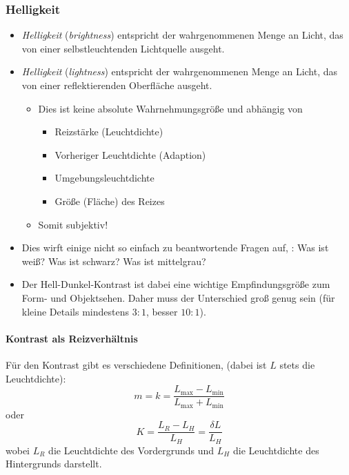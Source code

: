 			\subsubsection{Helligkeit}
				\begin{itemize}
					\item \emph{Helligkeit} (\emph{brightness}) entspricht der wahrgenommenen Menge an Licht, das von einer selbstleuchtenden Lichtquelle ausgeht.
					\item \emph{Helligkeit} (\emph{lightness}) entspricht der wahrgenommenen Menge an Licht, das von einer reflektierenden Oberfläche ausgeht.
						\begin{itemize}
							\item Dies ist keine absolute Wahrnehmungsgröße und abhängig von
								\begin{itemize}
									\item Reizstärke (Leuchtdichte)
									\item Vorheriger Leuchtdichte (Adaption)
									\item Umgebungsleuchtdichte
									\item Größe (Fläche) des Reizes
								\end{itemize}
							\item Somit subjektiv!
						\end{itemize}
					\item Dies wirft einige nicht so einfach zu beantwortende Fragen auf, \zB: Was ist weiß? Was ist schwarz? Was ist mittelgrau?
					\item Der Hell-Dunkel-Kontrast ist dabei eine wichtige Empfindungsgröße zum Form- und Objektsehen. Daher muss der Unterschied groß genug sein (für kleine Details mindestens \(3:1\), besser \(10:1\)).
				\end{itemize}

				\paragraph{Kontrast als Reizverhältnis}
					Für den Kontrast gibt es verschiedene Definitionen, \zB (dabei ist \(L\) stets die Leuchtdichte):
					\begin{equation*}
						m = k = \frac{L_\text{max} - L_\text{min}}{L_\text{max} + L_\text{min}}
					\end{equation*}
					oder
					\begin{equation*}
						K = \frac{L_R - L_H}{L_H} = \frac{\delta L}{L_H}
					\end{equation*}
					wobei \( L_R \) die Leuchtdichte des Vordergrunds und \(L_H\) die Leuchtdichte des Hintergrunds darstellt.

